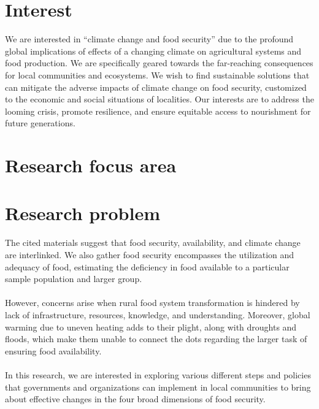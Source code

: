 \documentclass[12pt, twoside]{report}
\title{}
\author{Riddhiman}
\date{\monthyeardate\today}
\begin{document}



\begin{multicols}{2}
\section*{Interest}
We are interested in “climate change and food security” due to the profound global implications of effects of a changing climate on agricultural systems and food production. We are specifically geared towards the far-reaching consequences for local communities and ecosystems. We wish to find sustainable solutions that can mitigate the adverse impacts of climate change on food security, customized to the economic and social situations of localities. Our interests are to address the looming crisis, promote resilience, and ensure equitable access to nourishment for future generations.


\section*{Research focus area}

\section*{Research problem}
The cited materials suggest that food security, availability, and climate change are interlinked. We also gather food security encompasses the utilization and adequacy of food, estimating the deficiency in food available to a particular sample population and larger group. \\ \\ 
However, concerns arise when rural food system transformation is hindered by lack of infrastructure, resources, knowledge, and understanding. Moreover, global warming due to uneven heating adds to their plight, along with droughts and floods, which make them unable to connect the dots regarding the larger task of ensuring food availability. \\ \\
In this research, we are interested in exploring various different steps and policies that governments and organizations can implement in local communities to bring about effective changes in the four broad dimensions of food security.



\end{multicols}
\end{document}
